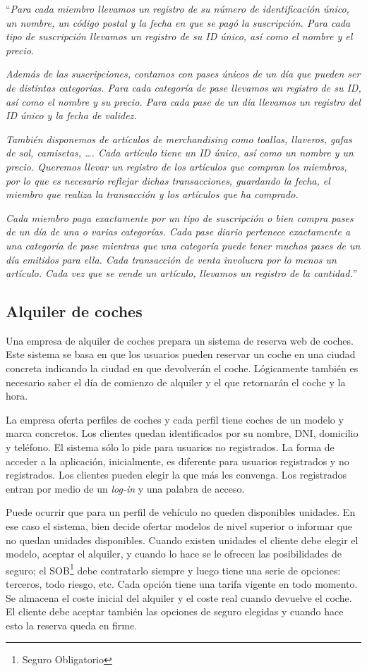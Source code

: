 \documentclass{db-practice}
\begin{document}
``\textit{Para cada miembro llevamos un registro de su número de identificación único, un nombre, un código postal y la fecha en que se pagó la suscripción. Para cada tipo de suscripción llevamos un registro de su ID único, así como el nombre y el precio.} 

\textit{Además de las suscripciones, contamos con pases únicos de un día que pueden ser de distintas categorías. Para cada categoría de pase llevamos un registro de su ID, así como el nombre y su precio. Para cada pase de un día llevamos un registro del ID único y la fecha de validez.}

\textit{También disponemos de artículos de merchandising como toallas, llaveros, gafas de sol, camisetas, \ldots. Cada artículo tiene un ID único, así como un nombre y un precio. Queremos llevar un registro de los artículos que compran los miembros, por lo que es necesario reflejar dichas transacciones, guardando la fecha, el miembro que realiza la transacción y los artículos que ha comprado.}

\textit{Cada miembro paga exactamente por un tipo de suscripción o bien compra pases de un día de una o varias categorías. Cada pase diario pertenece exactamente a una categoría de pase mientras que una categoría puede tener muchos pases de un día emitidos para ella. Cada transacción de venta involucra por lo menos un artículo. Cada vez que se vende un artículo, llevamos un registro de la cantidad.}''

\subsection{Alquiler de coches}
Una empresa de alquiler de coches prepara un sistema de reserva web de coches. Este sistema se basa en que los usuarios pueden reservar un coche en una ciudad concreta indicando la ciudad en que devolverán el coche. Lógicamente también es necesario saber el día de comienzo de alquiler y el que retornarán el coche y la hora. 

La empresa oferta perfiles de coches y cada perfil tiene coches de un modelo y marca concretos. Los clientes quedan identificados por su nombre, DNI, domicilio y teléfono. El sistema sólo lo pide para usuarios no registrados. La forma de acceder a la aplicación, inicialmente, es diferente para usuarios registrados y no registrados. Los clientes pueden elegir la que más les convenga. Los registrados entran por medio de un \textit{log-in} y una palabra de acceso.

Puede ocurrir que para un perfil de vehículo no queden disponibles unidades. En ese caso el sistema, bien decide ofertar modelos de nivel superior o informar que no quedan unidades disponibles. Cuando existen unidades el cliente debe elegir el modelo, aceptar el alquiler, y cuando lo hace se le ofrecen las posibilidades de seguro; el SOB\footnote{Seguro Obligatorio} debe contratarlo siempre y luego tiene una serie de opciones: terceros, todo riesgo, etc. Cada opción tiene una tarifa vigente en todo momento. Se almacena el coste inicial del alquiler y el coste real cuando devuelve el coche. El cliente debe aceptar también las opciones de seguro elegidas y cuando hace esto la reserva queda en firme. 
\end{document}
